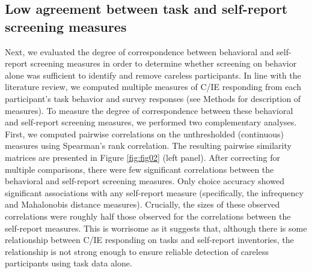 \documentclass[a4paper,notitlepage,12pt]{article}
\begin{document}
\subsection*{Low agreement between task and self-report screening measures}

Next, we evaluated the degree of correspondence between behavioral and self-report screening measures in order to determine whether screening on behavior alone was sufficient to identify and remove careless participants. In line with the literature review, we computed multiple measures of C/IE responding from each participant's task behavior and survey responses (see Methods for description of measures). To measure the degree of correspondence between these behavioral and self-report screening measures, we performed two complementary analyses. First, we computed pairwise correlations on the unthresholded (continuous) measures using Spearman's rank correlation. The resulting pairwise similarity matrices are presented in Figure \ref{fig:fig02} (left panel). After correcting for multiple comparisons, there were few significant correlations between the behavioral and self-report screening measures. Only choice accuracy showed significant associations with any self-report measure (specifically, the infrequency and Mahalonobis distance measures). Crucially, the sizes of these observed correlations were roughly half those observed for the correlations between the self-report measures. This is worrisome as it suggests that, although there is some relationship between C/IE responding on tasks and self-report inventories, the relationship is not strong enough to ensure reliable detection of careless participants using task data alone.
\end{document}
